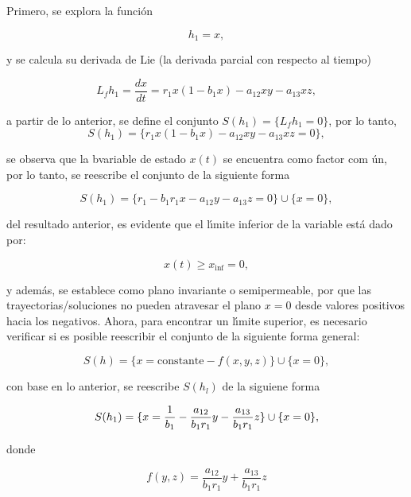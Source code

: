 \documentclass[letterpaper,11pt]{article}
\begin{document}
Primero, se explora la funci\'{o}n

\begin{equation*}
h_{1}=x,
\end{equation*}

y se calcula su derivada de Lie (la derivada parcial con respecto al tiempo)

\begin{equation*}
L_{f}h_{1}=\frac{dx}{dt}=r_{1}x(1-b_{1}x)-a_{12}xy-a_{13}xz,
\end{equation*}

a partir de lo anterior, se define el conjunto $S(h_{1})=\{L_{f}h_{1}=0\}$,
por lo tanto,%
\begin{equation*}
S(h_{1})=\{r_{1}x(1-b_{1}x)-a_{12}xy-a_{13}xz=0\},
\end{equation*}

se observa que la bvariable de estado $x(t)$ se encuentra como factor com%
\'{u}n, por lo tanto, se reescribe el conjunto de la siguiente forma

\begin{equation*}
S(h_{1})=\{r_{1}-b_{1}r_{1}x-a_{12}y-a_{13}z=0\}\cup \{x=0\},
\end{equation*}

del resultado anterior, es evidente que el l\'{\i}mite inferior de la
variable est\'{a} dado por:

\begin{equation*}
x(t)\geq x_{\inf }=0,
\end{equation*}

y adem\'{a}s, se establece como plano invariante o semipermeable, por que
las trayectorias/soluciones no pueden atravesar el plano $x=0$ desde valores
positivos hacia los negativos. Ahora, para encontrar un l\'{\i}mite
superior, es necesario verificar si es posible reescribir el conjunto de la
siguiente forma general:

\begin{equation*}
S(h)=\{x=\text{constante}-f(x,y,z)\}\cup \{x=0\},
\end{equation*}

con base en lo anterior, se reescribe $S(h_{l})$ de la siguiene forma

\begin{equation*}
S(h_{1})=\{x=\frac{1}{b_{1}}-\frac{a_{12}}{b_{1}r_{1}}y-\frac{a_{13}}{%
b_{1}r_{1}}z\}\cup \{x=0\},
\end{equation*}

donde

\begin{equation*}
f(y,z)=\frac{a_{12}}{b_{1}r_{1}}y+\frac{a_{13}}{b_{1}r_{1}}z
\end{equation*}
\end{document}
